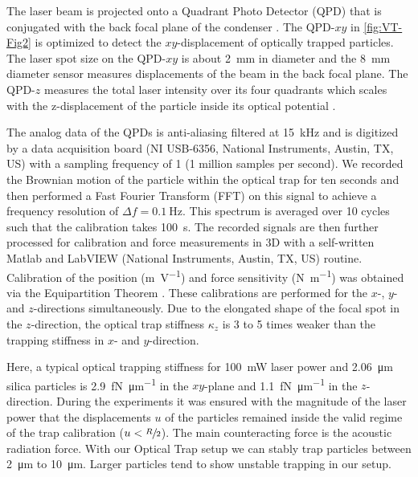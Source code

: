 The laser beam is projected onto a Quadrant Photo Detector (QPD) that is 
conjugated with the back focal plane of the condenser \cite{Bodensiek2013}. The 
QPD-$xy$ in \cref{fig:VT-Fig2} is optimized to detect the $xy$-displacement of 
optically trapped particles. The laser spot size on the QPD-$xy$ is about 
\SI{2}{\mm} in diameter and the \SI{8}{\mm} diameter sensor measures 
displacements of the beam in the back focal plane. The QPD-$z$ measures the 
total laser intensity over its four quadrants which scales with the 
z-displacement of the particle inside its optical potential \cite{Dreyer2004}.

The analog data of the QPDs is anti-aliasing filtered at \SI{15}{\kilo\hertz} 
and is digitized by a data acquisition board (NI USB-6356, National Instruments, 
Austin, TX, US) with a sampling frequency of \SI{1}{\MS} (1 million samples per 
second). We recorded the Brownian motion of the particle within the optical trap 
for ten seconds and then performed a Fast Fourier Transform (FFT) on this signal 
to achieve a frequency resolution of $\Delta f=\SI{0.1}{\hertz}$. This spectrum 
is averaged over 10 cycles such that the calibration takes \SI{100}{\second}.  
The recorded signals are then further processed for calibration and force 
measurements in 3D with a self-written Matlab and LabVIEW (National Instruments, 
Austin, TX, US) routine.  Calibration of the position (\si{\meter\per\volt}) and 
force sensitivity (\si{\newton\per\meter}) was obtained via the Equipartition 
Theorem \cite{Svoboda1994,Vermeulen2006}. These calibrations are performed for the $x$-, 
$y$- and $z$-directions simultaneously. Due to the elongated shape of the focal 
spot in the $z$-direction, the optical trap stiffness $\kappa_z$ is 3 to 5 times 
weaker than the trapping stiffness in $x$- and $y$-direction. 

Here, a typical optical trapping stiffness for \SI{100}{\milli\watt} laser power 
and \SI{2.06}{\micro\meter} silica particles is 
\SI{2.9}{\femto\newton\per\micro\meter} in the $xy$-plane and 
\SI{1.1}{\femto\newton\per\micro\meter} in the $z$-direction. During the 
experiments it was ensured with the magnitude of the laser power that the 
displacements $u$ of the particles remained inside the valid regime of the trap 
calibration ($u<\sfrac{R}{2}$). The main counteracting force is the acoustic 
radiation force. With our Optical Trap setup we can stably trap particles 
between \SI{2}{\micro\meter} to \SI{10}{\micro\meter}. Larger particles tend to 
show unstable trapping in our setup.

